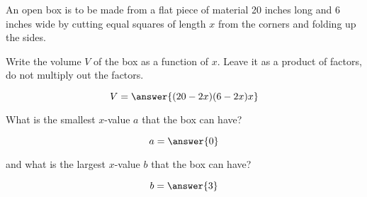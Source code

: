 \documentclass{ximera}
\author{}
\begin{document}
\licenseAPC
\begin{exercise}

An open box is to be made from a flat piece of material 20 inches long and 6 inches wide by cutting equal squares of length $x$ from the corners and folding up the sides.

Write the volume $V$ of the box as a function of $x$. Leave it as a product of factors, do not multiply out the factors.

$$V=\answer{(20-2x)(6-2x)x}$$

What is the smallest $x$-value $a$ that the box can have?

$$a=\answer{0}$$

and what is the largest $x$-value $b$ that the box can have?

$$b=\answer{3}$$








\end{exercise}
\end{document}
